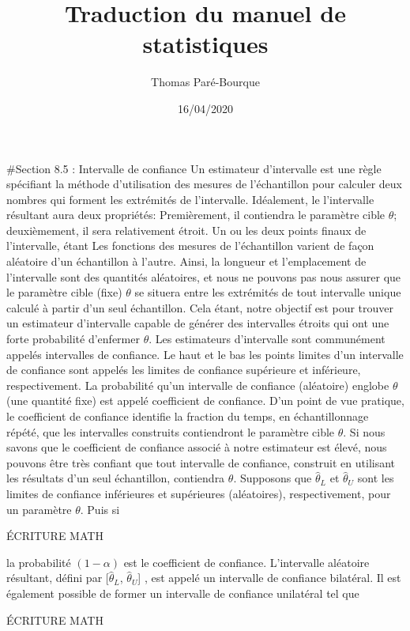 \documentclass[]{article}
\title{Traduction du manuel de statistiques}
\author{Thomas Paré-Bourque}
\date{16/04/2020}
\begin{document}
\maketitle

\#Section 8.5 : Intervalle de confiance Un estimateur d'intervalle est
une règle spécifiant la méthode d'utilisation des mesures de
l'échantillon pour calculer deux nombres qui forment les extrémités de
l'intervalle. Idéalement, le l'intervalle résultant aura deux
propriétés: Premièrement, il contiendra le paramètre cible \(\theta\);
deuxièmement, il sera relativement étroit. Un ou les deux points finaux
de l'intervalle, étant Les fonctions des mesures de l'échantillon
varient de façon aléatoire d'un échantillon à l'autre. Ainsi, la
longueur et l'emplacement de l'intervalle sont des quantités aléatoires,
et nous ne pouvons pas nous assurer que le paramètre cible (fixe)
\(\theta\) se situera entre les extrémités de tout intervalle unique
calculé à partir d'un seul échantillon. Cela étant, notre objectif est
pour trouver un estimateur d'intervalle capable de générer des
intervalles étroits qui ont une forte probabilité d'enfermer \(\theta\).
Les estimateurs d'intervalle sont communément appelés intervalles de
confiance. Le haut et le bas les points limites d'un intervalle de
confiance sont appelés les limites de confiance supérieure et
inférieure, respectivement. La probabilité qu'un intervalle de confiance
(aléatoire) englobe \(\theta\) (une quantité fixe) est appelé
coefficient de confiance. D'un point de vue pratique, le coefficient de
confiance identifie la fraction du temps, en échantillonnage répété, que
les intervalles construits contiendront le paramètre cible \(\theta\).
Si nous savons que le coefficient de confiance associé à notre
estimateur est élevé, nous pouvons être très confiant que tout
intervalle de confiance, construit en utilisant les résultats d'un seul
échantillon, contiendra \(\theta\). Supposons que \(\widehat{\theta}_L\)
et \(\widehat{\theta}_U\) sont les limites de confiance inférieures et
supérieures (aléatoires), respectivement, pour un paramètre \(\theta\).
Puis si

ÉCRITURE MATH

la probabilité \((1-\alpha)\) est le coefficient de confiance.
L'intervalle aléatoire résultant, défini par {[}\(\widehat{\theta}_L\),
\(\widehat{\theta}_U\){]} , est appelé un intervalle de confiance
bilatéral. Il est également possible de former un intervalle de
confiance unilatéral tel que

ÉCRITURE MATH
\end{document}
